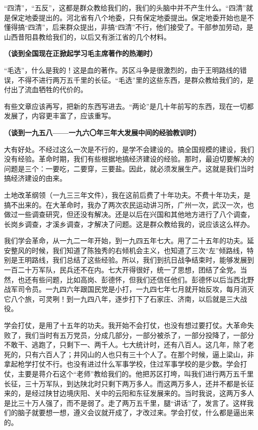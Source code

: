 “四清”，“五反”，这都是群众教给我们的，我们的头脑中并不产生什么。“四清”就是保定地委提出的。河北省有八个地委，只有保定地委提出。保定地委开始也是不懂得搞“四清”，后来群众提出，非搞“四清”不行，他们接受了。干部参加劳动，是山西昔阳县教给我们的，以后又有浙江省的几个材料。

\textbf{（谈到全国现在正掀起学习毛主席著作的热潮时）}

“毛选”，什么是我的！这是血的著作。苏区斗争是很激烈的，由于王明路线的错误，不得不进行两万五千里的长征。“毛选”里的这些东西，是群众教给我们的，是付出了流血牺牲的代价的。

有些文章应该再写，把新的东西写进去。“两论”是几十年前写的东西，现在一切都发展了，内容更丰富了，应该重写。

\textbf{（谈到一九五八——一九六〇年三年大发展中间的经验教训时）}

大有好处。不经过这么一次是不行的，是学不会建设的。搞全国规模的建设，我们没有经验。革命时期，我们有些根据地搞经济建设的经验。那时，最迫切要解决的问题是三个：一要吃，二要穿，三要盐。因此，就必须发展生产。这就是我们当时搞经济建设的由来。

土地改革纲领（一九三三年文件），我在这前后费了十年功夫。不费十年功夫，是搞不出来的。在大革命时，我办了两次农民运动讲习所，广州一次，武汉一次，也做过一些调查研究，但还没有解决。还是以后在兴国和其他地方进行了八个调查，长岗乡调查，才溪乡调查，才解决了问题。这是群众教给我的，说应该这么样办。

我们学会革命，从一九二一年开始，到一九四五年七大。用了二十五年的功夫。延安整风的时候，我们知道了陈独秀的右倾机会主义，也知道了三次“左”倾路线，特别是王明路线，我们总结了这些经验。所以，我们到抗日战争结束时，能够发展到一百二十万军队，民兵还不在内。七大开得很好，统一了思想，团结了全党。当然，也还有些问题，比如高岗、彭德怀，但我们还信任他们。彭德怀以后当西北野战军司令员。一九四六年跟国民党是小打，一九四七年七月就开始反攻，每月消灭它八个旅，可灵咧！到一九四八年，逐步打下了石家庄、济南，以后就是三大战役。

学会打仗，是用了十五年的功夫。我开始不会打仗，也没有想过要打仗。大革命失败了，我们当时有五万党员，分成几部分，一部分被杀了，一部分投降了，一部分不敢干、逃跑了，只剩下一、两千人。七大统计时，还有八百人。这几年，除了老死的，只有六百人了；井冈山的人也只有三十个人了。在那个时候，逼上梁山，非拿起枪学打仗不行。也没有进过什么军事学校，住过军事学校的是少数。学会打仗，主要是蒋介石这个“老师”教给我们的。他把苏区打垮，叫我们进行两万五千里长征，三十万军队，到达陕北时只剩下两万多人。而这两万多人，还并不都是长征来的，是经过陕甘边境庆阳、关中的云阳和东征发展来的。当时我说，这两万多人是比三十万人强了，而不是弱了。走了两万五千里，腿“讲话”了，发言了。这样我们的脑子就要想一想，遵义会议就开成了，才改过来。学会打仗，什么都是逼出来的。

